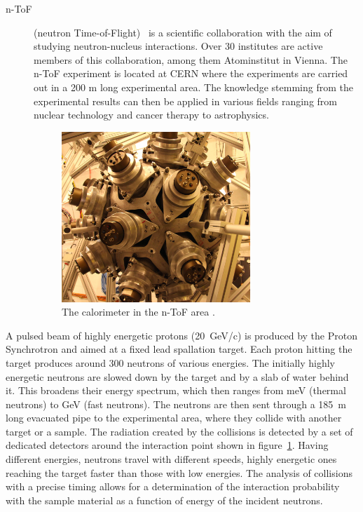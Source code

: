 \begin{description}
\item[n-ToF] (neutron Time-of-Flight)~\cite{NTOF:00000} is a scientific collaboration with the aim of studying neutron-nucleus interactions. Over 30 institutes are active members of this collaboration, among them Atominstitut in Vienna. The n-ToF experiment is located at CERN where the experiments are carried out in a 200 m long experimental area. The knowledge stemming from the experimental results can then be applied in various fields ranging from nuclear technology and cancer therapy to astrophysics.
\begin{figure}[!t]
\centering
\includegraphics[width=0.7\textwidth]{01_introduction/pics/ntof}
\caption{The calorimeter in the n-ToF area \cite{Maximilien:1304589}.}
\label{fig:ntof}
\end{figure}
\end{description}
A pulsed beam of highly energetic protons (20~GeV/c) is produced by the Proton Synchrotron and aimed at a fixed lead spallation target. Each proton hitting the target produces around 300 neutrons of various energies. The initially highly energetic neutrons are slowed down by the target and by a slab of water behind it. This broadens their energy spectrum, which then ranges from meV (thermal neutrons) to GeV (fast neutrons). The neutrons are then sent through a 185~m long evacuated pipe to the experimental area, where they collide with another target or a sample. The radiation created by the collisions is detected by a set of dedicated detectors around the interaction point shown in figure~\ref{fig:ntof}. Having different energies, neutrons travel with different speeds, highly energetic ones reaching the target faster than those with low energies. The analysis of collisions with a precise timing allows for a determination of the interaction probability with the sample material as a function of energy of the incident neutrons.






